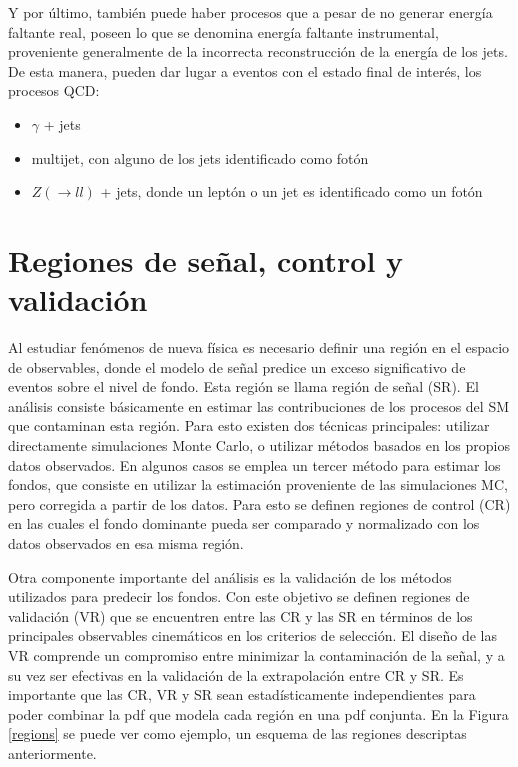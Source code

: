 Y por último, también puede haber procesos que a pesar de no generar energía faltante real, poseen lo que se denomina energía faltante instrumental, proveniente generalmente de la incorrecta reconstrucción de la energía de los jets. De esta manera, pueden dar lugar a eventos con el estado final de interés, los procesos QCD:

\begin{itemize}

	\item $\gamma$ + jets

	\item multijet, con alguno de los jets identificado como fotón

	\item $Z(\rightarrow ll)$ + jets, donde un leptón o un jet es identificado como un fotón

\end{itemize}



\section{Regiones de señal, control y validación}

Al estudiar fenómenos de nueva física es necesario definir una región en el espacio de observables, donde el modelo de señal predice un exceso significativo de eventos sobre el nivel de fondo. Esta región se llama región de señal (SR). El análisis consiste básicamente en estimar las contribuciones de los procesos del SM que contaminan esta región. Para esto existen dos técnicas principales: utilizar directamente simulaciones Monte Carlo, o utilizar métodos basados en los propios datos observados. En algunos casos se emplea un tercer método para estimar los fondos, que consiste en utilizar la estimación proveniente de las simulaciones MC, pero corregida a partir de los datos. Para esto se definen regiones de control (CR) en las cuales el fondo dominante pueda ser comparado y normalizado con los datos observados en esa misma región. 

Otra componente importante del análisis es la validación de los métodos utilizados para predecir los fondos. Con este objetivo se definen regiones de validación (VR) que se encuentren entre las CR y las SR en términos de los principales observables cinemáticos en los criterios de selección. El diseño de las VR comprende un compromiso entre minimizar la contaminación de la señal, y a su vez ser efectivas en la validación de la extrapolación entre CR y SR. Es importante que las CR, VR y SR sean estadísticamente independientes para poder combinar la pdf que modela cada región en una pdf conjunta. En la Figura \ref{regions} se puede ver como ejemplo, un esquema de las regiones descriptas anteriormente.

